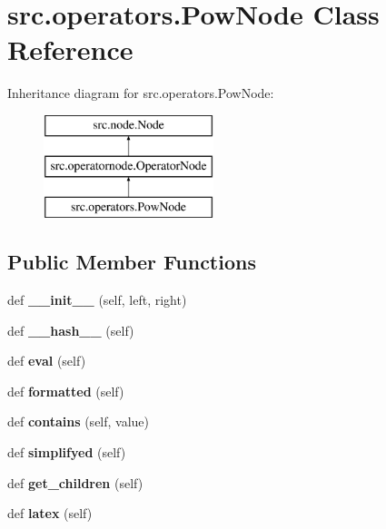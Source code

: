 \hypertarget{classsrc_1_1operators_1_1PowNode}{}\section{src.\+operators.\+Pow\+Node Class Reference}
\label{classsrc_1_1operators_1_1PowNode}
Inheritance diagram for src.\+operators.\+Pow\+Node\+:\begin{figure}[H]
\begin{center}
\leavevmode
\includegraphics[height=3.000000cm]{classsrc_1_1operators_1_1PowNode}
\end{center}
\end{figure}
\subsection*{Public Member Functions}
\begin{DoxyCompactItemize}
\item 
\mbox{\label{classsrc_1_1operators_1_1PowNode_a5fa7636ca29e14313d3d4fbfda132a44}} 
def {\bfseries \+\_\+\+\_\+init\+\_\+\+\_\+} (self, left, right)
\item 
\mbox{\label{classsrc_1_1operators_1_1PowNode_a69b1f29b606f3ed9f5fb6e4acbf299d7}} 
def {\bfseries \+\_\+\+\_\+hash\+\_\+\+\_\+} (self)
\item 
\mbox{\label{classsrc_1_1operators_1_1PowNode_a63017687d2d16840023e42dc22b8fc2b}} 
def {\bfseries eval} (self)
\item 
\mbox{\label{classsrc_1_1operators_1_1PowNode_a45d0e4cb2217f175e3c31c750c129f99}} 
def {\bfseries formatted} (self)
\item 
\mbox{\label{classsrc_1_1operators_1_1PowNode_ad9e8821e363fd37762331dc8abb5265a}} 
def {\bfseries contains} (self, value)
\item 
\mbox{\label{classsrc_1_1operators_1_1PowNode_aec4398a301e3dbf7ec19762fde70521b}} 
def {\bfseries simplifyed} (self)
\item 
\mbox{\label{classsrc_1_1operators_1_1PowNode_adc7eb91977008ce8bde2d763f7b00c44}} 
def {\bfseries get\+\_\+children} (self)
\item 
\mbox{\label{classsrc_1_1operators_1_1PowNode_ad84893a2c9e99d4bbc221399d517d528}} 
def {\bfseries latex} (self)
\end{DoxyCompactItemize}
